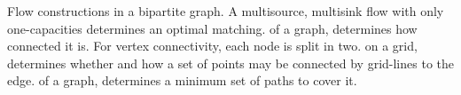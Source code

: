 \begin{algorithm}{Flow constructions}
 in a bipartite graph. A multisource, multisink flow
with only one-capacities determines an optimal matching.
 of a graph, determines how connected
it is. For vertex connectivity, each node is split in two.
 on a grid, determines whether and how a set of
points may be connected by grid-lines to the edge.
 of a graph, determines a minimum set of paths to
cover it.
\end{algorithm}

